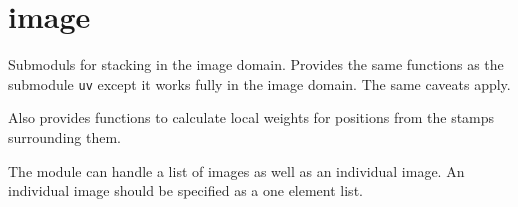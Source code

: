\documentclass{article}
\begin{document}
\section{image}
Submoduls for stacking in the image domain.
Provides the same functions as the submodule {\tt uv} except it works fully in the image domain.
The same caveats apply. 

Also provides functions to calculate local weights for positions from the stamps surrounding them.

The module can handle a list of images as well as an individual image.
An individual image should be specified as a one element list.
\end{document}
